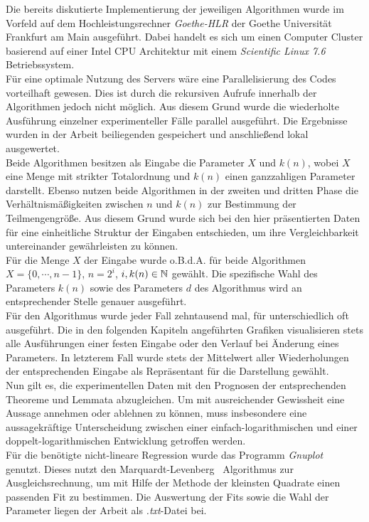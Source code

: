 \noindent
Die bereits diskutierte Implementierung der jeweiligen Algorithmen wurde im Vorfeld auf dem Hochleistungsrechner \textit{Goethe-HLR} der Goethe Universität Frankfurt am Main ausgeführt. Dabei handelt es sich um einen Computer Cluster basierend auf einer Intel CPU Architektur mit einem \textit{Scientific Linux 7.6} Betriebssystem.\\
Für eine optimale Nutzung des Servers wäre eine Parallelisierung des Codes vorteilhaft gewesen. Dies ist durch die rekursiven Aufrufe innerhalb der Algorithmen jedoch nicht möglich. Aus diesem Grund wurde die wiederholte Ausführung einzelner experimenteller Fälle parallel ausgeführt. Die Ergebnisse wurden in der Arbeit beiliegenden \csv gespeichert und anschließend lokal ausgewertet.\\[.1cm]


\noindent
Beide Algorithmen besitzen als Eingabe die Parameter $X$ und $k(n)$, wobei $X$ eine Menge mit strikter Totalordnung und $k(n)$ einen ganzzahligen Parameter darstellt. Ebenso nutzen beide Algorithmen in der zweiten und dritten Phase die Verhältnismäßigkeiten zwischen $n$ und $k(n)$ zur Bestimmung der Teilmengengröße. Aus diesem Grund wurde sich bei den hier präsentierten Daten für eine einheitliche Struktur der Eingaben entschieden, um ihre Vergleichbarkeit untereinander gewährleisten zu können.\\[.05cm]
Für die Menge $X$ der Eingabe wurde o.B.d.A. für beide Algorithmen $X=\{0,\cdots,n-1\}$, $n=2^i$, $i,k(n)\in\mathbb{N}$ gewählt. Die spezifische Wahl des Parameters $k(n)$ sowie des Parameters $d$ des Algorithmus \RM wird an entsprechender Stelle genauer ausgeführt.\\
Für den Algorithmus \Rm wurde jeder Fall zehntausend mal, für \RM unterschiedlich oft ausgeführt. Die in den folgenden Kapiteln angeführten Grafiken visualisieren stets alle Ausführungen einer festen Eingabe oder den Verlauf bei Änderung eines Parameters. In letzterem Fall wurde stets der Mittelwert aller Wiederholungen der entsprechenden Eingabe als Repräsentant für die Darstellung gewählt.\\[.1cm]

\noindent
Nun gilt es, die experimentellen Daten mit den Prognosen der entsprechenden Theoreme und Lemmata abzugleichen. Um mit ausreichender Gewissheit eine Aussage annehmen oder ablehnen zu können, muss insbesondere eine aussagekräftige Unterscheidung zwischen einer einfach-logarithmischen und einer doppelt-logarithmischen Entwicklung getroffen werden.\\[.05cm]
Für die benötigte nicht-lineare Regression wurde das Programm \textit{Gnuplot}~\cite[S.74-81]{gnu} genutzt. Dieses nutzt den Marquardt-Levenberg~\cite[S.65-68]{gnu2} Algorithmus zur Ausgleichsrechnung, um mit Hilfe der Methode der kleinsten Quadrate einen passenden Fit zu bestimmen. Die Auswertung der Fits sowie die Wahl der Parameter liegen der Arbeit als \textit{.txt}-Datei bei.



